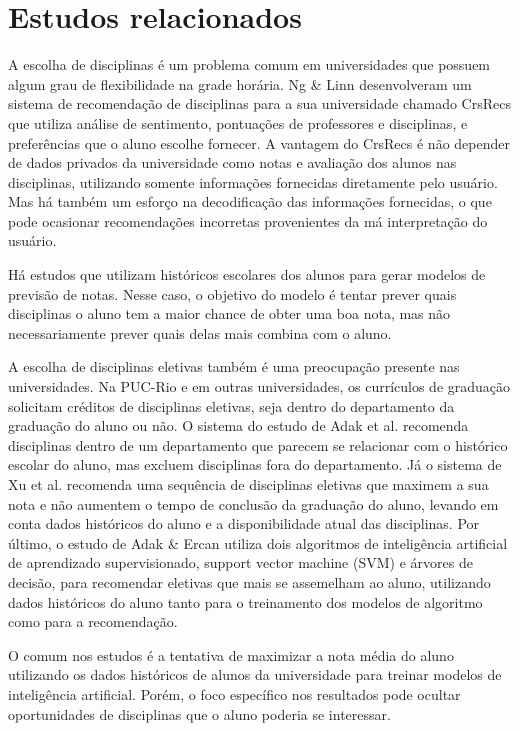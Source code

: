 \section{Estudos relacionados}

A escolha de disciplinas é um problema comum em universidades que possuem algum grau de flexibilidade na grade horária. Ng \& Linn\cite{crs-recs} desenvolveram um sistema de recomendação de disciplinas para a sua universidade chamado CrsRecs que utiliza análise de sentimento, pontuações de professores e disciplinas, e preferências que o aluno escolhe fornecer. A vantagem do CrsRecs é não depender de dados privados da universidade como notas e avaliação dos alunos nas disciplinas, utilizando somente informações fornecidas diretamente pelo usuário. Mas há também um esforço na decodificação das informações fornecidas, o que pode ocasionar recomendações incorretas provenientes da má interpretação do usuário.

Há estudos que utilizam históricos escolares dos alunos para gerar modelos de previsão de notas.\cite{rani-machine-learning,nguyen-learning-outcome,adak-fuzzy} Nesse caso, o objetivo do modelo é tentar prever quais disciplinas o aluno tem a maior chance de obter uma boa nota, mas não necessariamente prever quais delas mais combina com o aluno.\cite{rani-machine-learning,nguyen-learning-outcome}

A escolha de disciplinas eletivas também é uma preocupação presente nas universidades. Na PUC-Rio e em outras universidades, os currículos de graduação solicitam créditos de disciplinas eletivas, seja dentro do departamento da graduação do aluno ou não. O sistema do estudo de Adak et al.\cite{adak-fuzzy} recomenda disciplinas dentro de um departamento que parecem se relacionar com o histórico escolar do aluno, mas excluem disciplinas fora do departamento.
Já o sistema de Xu et al.\cite{xu-personalizado} recomenda uma sequência de disciplinas eletivas que maximem a sua nota e não aumentem o tempo de conclusão da graduação do aluno, levando em conta dados históricos do aluno e a disponibilidade atual das disciplinas. 
Por último, o estudo de Adak \& Ercan\cite{adak-svm} utiliza dois algoritmos de inteligência artificial de aprendizado supervisionado, support vector machine (SVM) e árvores de decisão, para recomendar eletivas que mais se assemelham ao aluno, utilizando dados históricos do aluno tanto para o treinamento dos modelos de algoritmo como para a recomendação.

O comum nos estudos é a tentativa de maximizar a nota média do aluno utilizando os dados históricos de alunos da universidade para treinar modelos de inteligência artificial.\cite{rani-machine-learning,nguyen-learning-outcome,adak-fuzzy,adak-svm} Porém, o foco específico nos resultados pode ocultar oportunidades de disciplinas que o aluno poderia se interessar.

